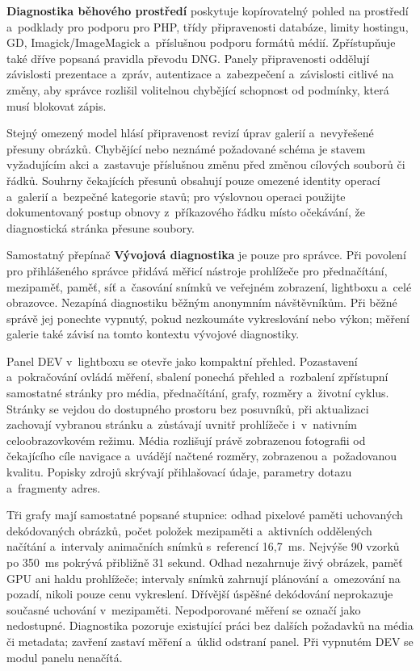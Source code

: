 \documentclass[11pt,a4paper]{article}
\newcommand{\ui}[1]{\textbf{#1}}
\begin{document}
\ui{Diagnostika běhového prostředí} poskytuje kopírovatelný pohled na prostředí
a~podklady pro podporu pro PHP, třídy připravenosti databáze, limity hostingu,
GD, Imagick/ImageMagick a~příslušnou podporu formátů médií. Zpřístupňuje také
dříve popsaná pravidla převodu DNG. Panely připravenosti oddělují závislosti
prezentace a~zpráv, autentizace a~zabezpečení a~závislosti citlivé na změny, aby
správce rozlišil volitelnou chybějící schopnost od podmínky, která musí blokovat
zápis.

Stejný omezený model hlásí připravenost revizí úprav galerií a~nevyřešené
přesuny obrázků. Chybějící nebo neznámé požadované schéma je stavem vyžadujícím
akci a~zastavuje příslušnou změnu před změnou cílových souborů či řádků. Souhrny
čekajících přesunů obsahují pouze omezené identity operací a~galerií a~bezpečné
kategorie stavů; pro výslovnou operaci použijte dokumentovaný postup obnovy
z~příkazového řádku místo očekávání, že diagnostická stránka přesune soubory.

Samostatný přepínač \ui{Vývojová diagnostika} je pouze pro správce. Při povolení
pro přihlášeného správce přidává měřicí nástroje prohlížeče pro přednačítání,
mezipaměť, paměť, síť a~časování snímků ve veřejném zobrazení, lightboxu a~celé
obrazovce. Nezapíná diagnostiku běžným anonymním návštěvníkům. Při běžné správě
jej ponechte vypnutý, pokud nezkoumáte vykreslování nebo výkon; měření galerie
také závisí na tomto kontextu vývojové diagnostiky.

Panel DEV v~lightboxu se otevře jako kompaktní přehled. Pozastavení
a~pokračování ovládá měření, sbalení ponechá přehled a~rozbalení zpřístupní
samostatné stránky pro média, přednačítání, grafy, rozměry a~životní cyklus.
Stránky se vejdou do dostupného prostoru bez posuvníků, při aktualizaci
zachovají vybranou stránku a~zůstávají uvnitř prohlížeče i~v~nativním
celoobrazovkovém režimu. Média rozlišují právě zobrazenou fotografii od
čekajícího cíle navigace a~uvádějí načtené rozměry, zobrazenou a~požadovanou
kvalitu. Popisky zdrojů skrývají přihlašovací údaje, parametry dotazu
a~fragmenty adres.

Tři grafy mají samostatné popsané stupnice: odhad pixelové paměti uchovaných
dekódovaných obrázků, počet položek mezipaměti a~aktivních oddělených načítání
a~intervaly animačních snímků s~referencí 16,7~ms. Nejvýše 90 vzorků po 350~ms
pokrývá přibližně 31 sekund. Odhad nezahrnuje živý obrázek, paměť GPU ani haldu
prohlížeče; intervaly snímků zahrnují plánování a~omezování na pozadí, nikoli
pouze cenu vykreslení. Dřívější úspěšné dekódování neprokazuje současné uchování
v~mezipaměti. Nepodporované měření se označí jako nedostupné. Diagnostika
pozoruje existující práci bez dalších požadavků na média či metadata; zavření
zastaví měření a~úklid odstraní panel. Při vypnutém DEV se modul panelu
nenačítá.
\end{document}
